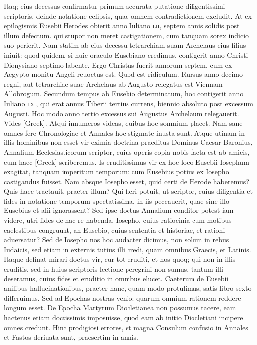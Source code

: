 \begin{parnumbers}
{}
\lnr{}Itaq; eius decessus confirmatur primum accurata putatione
diligentissimi scriptoris, deinde notatione eclipsis, quae omnem contradictionem
excludit.
\lnr{}At ex epilogismis Eusebii Herodes obierit
anno Iuliano \textsc{lii}, septem annis solidis post illum defectum.
\lnr{}qui stupor non meret castigationem, cum tanquam sorex indicio suo perierit.
\lnr{}Nam statim ab eius decessu tetrarchiam suam Archelaus eius filius
iniuit: quod quidem, si huic oraculo Eusebiano credimus, contigerit
anno Christi Dionysiano septimo labente.
\lnr{}Ergo Christus fuerit
annorum septem, cum ex Aegypto monitu Angeli reuoctus est.
\lnr{}Quod est ridiculum.
\lnr{}Rursus anno decimo regni, aut tetrarchiae suae
Archelaus ab Augusto relegatus est Viennam Allobrogum.
\lnr{}Secundum tempus ab Eusebio determinatum, hoc contigerit anno Iuliano
\textsc{lxi}, qui erat annus Tiberii tertius currens, biennio absoluto
post excessum Augusti.
\lnr{}Hoc modo anno tertio excessus sui Augustus
Archelaum relegauerit.
\lnr{}Vides \textgreek{[Greek]}.
\lnr{}Atqui innumeros videas,
quibus hoc somnium placet.
\lnr{}Nam sane omnes fere Chronologiae
et Annales hoc stigmate inusta sunt.
\lnr{}Atque utinam in illis hominibus
non esset vir eximia doctrina praeditus Dominus Caesar Baronius,
Annalium Ecclesiasticorum scriptor, cuius operis copia nobis
facta est ab amicis, cum haec \textgreek{[Greek]} scriberemus.
\lnr{}Is eruditissimus
vir ex hoc loco Eusebii Iosephum exagitat, tanquam imperitum
temporum: cum Eusebius potius ex Iosepho castigandus fuisset.
\lnr{}Nam absque Iosepho esset, quid certi de Herode haberemus?
\lnr{}Quis haec tractauit, praeter illum?
\lnr{}Qui fieri potuit, ut scriptor, cuius diligentia
et fides in notatione temporum spectatissima, in iis peccauerit,
quae sine illo Eusebius et alii ignorassent?
\lnr{}Sed ipse doctus Annalium
conditor potest iam videre, utri fides de hac re habenda, Iosepho,
cuius ratiocinia cum motibus caelestibus congruunt, an Eusebio,
cuius sententia et historiae, et rationi aduersatur?
\lnr{}Sed de Iosepho
nos hoc audacter dicimus, non solum in rebus Iudaicis, sed etiam
in externis tutius illi credi, quam omnibus Graecis, et Latinis.
\lnr{}Itaque
definat mirari doctus vir, cur tot eruditi, et nos quoq; qui non in illis
eruditis, sed in huius scriptoris lectione peregrini non sumus, tantum
illi deseramus, cuius fides et eruditio in omnibus elucet.
\lnr{}Caeterum de Eusebii anilibus hallucinationibus, praeter hanc, quam
modo protulimus, satis libro sexto differuimus.
\lnr{}Sed ad Epochas
nostras venio: quarum omnium rationem reddere longum esset.
\lnr{}De Epocha Martyrum Diocletianea non possumus tacere, eam hactenus
etiam doctissimis imposuisse, quod eam ab initio Diocletiani
incipere omnes credunt.
\lnr{}Hinc prodigiosi errores, et magna Consulum
confusio in Annales et Fastos deriuata sunt, praesertim in annis.


\end{parnumbers}

